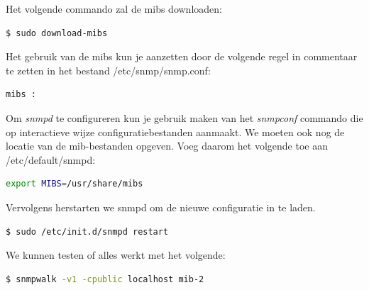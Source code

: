 Het volgende commando zal de \glspl{mib} downloaden:

\begin{lstlisting}[language=bash]
$ sudo download-mibs
\end{lstlisting}

Het gebruik van de \glspl{mib} kun je aanzetten door de volgende regel in commentaar te zetten in het bestand /etc/snmp/snmp.conf:

\begin{lstlisting}[language=bash]
mibs :
\end{lstlisting}

Om \textit{snmpd} te configureren kun je gebruik maken van het \textit{snmpconf} commando die op interactieve wijze configuratiebestanden aanmaakt.
We moeten ook nog de locatie van de \gls{mib}-bestanden opgeven. Voeg daarom het volgende toe aan /etc/default/snmpd:

\begin{lstlisting}[language=bash]
export MIBS=/usr/share/mibs
\end{lstlisting}

Vervolgens herstarten we snmpd om de nieuwe configuratie in te laden.

\begin{lstlisting}[language=bash]
$ sudo /etc/init.d/snmpd restart
\end{lstlisting}

We kunnen testen of alles werkt met het volgende:

\begin{lstlisting}[language=bash]
$ snmpwalk -v1 -cpublic localhost mib-2
\end{lstlisting}






